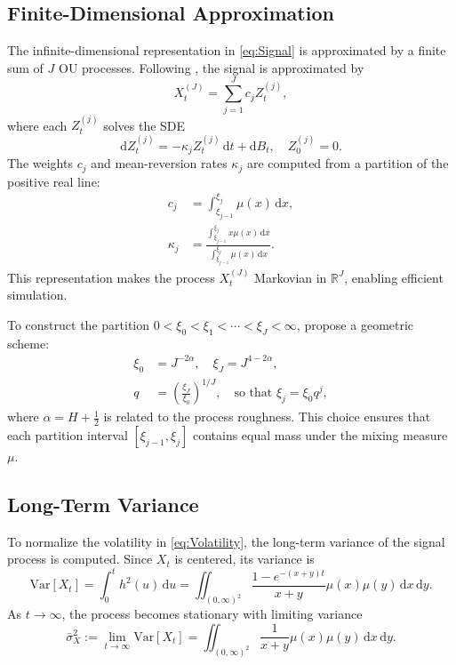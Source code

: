 \subsection{Finite-Dimensional Approximation} \label{subsec:FiniteDimApprox}

The infinite-dimensional representation in \eqref{eq:Signal} is approximated by a finite sum of $J$ OU processes. Following \citet{CarmonaCoutinMontseny2000}, the signal is approximated by
\begin{equation} \label{eq:FiniteApprox}
    X_t^{(J)} = \sum_{j=1}^J c_j Z_t^{(j)},
\end{equation}
where each $Z_t^{(j)}$ solves the SDE
\begin{equation}
    \mathrm{d} Z_t^{(j)} = -\kappa_j Z_t^{(j)} \,\mathrm{d}t + \mathrm{d}B_t, \quad Z_0^{(j)} = 0.
\end{equation}
The weights $c_j$ and mean-reversion rates $\kappa_j$ are computed from a partition of the positive real line:
\begin{align}
    c_j &= \int_{\xi_{j-1}}^{\xi_j} \mu(x) \,\mathrm{d}x, \label{eq:OUWeights} \\
    \kappa_j &= \frac{\int_{\xi_{j-1}}^{\xi_j} x \mu(x) \,\mathrm{d}x}{\int_{\xi_{j-1}}^{\xi_j} \mu(x) \,\mathrm{d}x}. \label{eq:OUSpeeds}
\end{align}
This representation makes the process $X_t^{(J)}$ Markovian in $\mathbb{R}^J$, enabling efficient simulation.

To construct the partition $0 < \xi_0 < \xi_1 < \cdots < \xi_J < \infty$, \citet{DamianFrey2024} propose a geometric scheme:
\begin{align}
    \xi_0 &= J^{-2\alpha}, \quad \xi_J = J^{4 - 2\alpha}, \\
    q &= \left( \frac{\xi_J}{\xi_0} \right)^{1/J}, \quad \text{so that } \xi_j = \xi_0 q^j,
\end{align}
where $\alpha = H + \tfrac{1}{2}$ is related to the process roughness. This choice ensures that each partition interval $[\xi_{j-1}, \xi_j]$ contains equal mass under the mixing measure $\mu$.


\subsection{Long-Term Variance} \label{subsec:LongTermVariance}

To normalize the volatility in \eqref{eq:Volatility}, the long-term variance of the signal process is computed. Since $X_t$ is centered, its variance is
\begin{equation} \label{eq:SignalVariance}
    \mathrm{Var}[X_t] = \int_0^t h^2(u) \,\mathrm{d}u = \iint_{(0,\infty)^2} \frac{1 - e^{-(x+y)t}}{x + y} \mu(x)\mu(y) \,\mathrm{d}x \,\mathrm{d}y.
\end{equation}
As $t \to \infty$, the process becomes stationary with limiting variance
\begin{equation}
    \bar{\sigma}_X^2 := \lim_{t \to \infty} \mathrm{Var}[X_t] = \iint_{(0,\infty)^2} \frac{1}{x + y} \mu(x)\mu(y) \,\mathrm{d}x \,\mathrm{d}y.
\end{equation}

